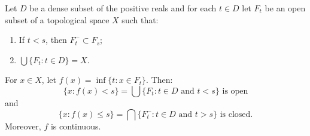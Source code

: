 Let $D$ be a dense subset of the positive reals and for each $t \in D$ let $F_t$ be an open subset of a topological space $X$ such that:
\begin{enumerate}
\item[(a)] If $t < s$, then $F_t^{-} \subset F_s$;
\item[(b)] $\bigcup \{F_t : t \in D\} = X$.
\end{enumerate}
For $x \in X$, let $f(x) = \inf \{t : x \in F_t\}$. Then:
$$\{x : f(x) < s\} = \bigcup \{F_t : t \in D \text{ and } t < s\} \text{ is open}$$
and
$$\{x : f(x) \leq s\} = \bigcap \{F_t^{-} : t \in D \text{ and } t > s\} \text{ is closed}.$$
Moreover, $f$ is continuous.
